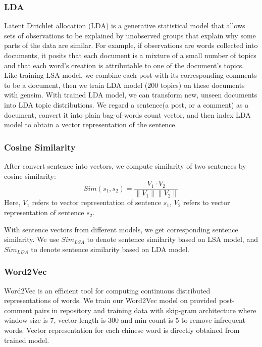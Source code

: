 \documentclass{sig-alternate}
\begin{document}

\subsubsection{LDA}
Latent Dirichlet allocation (LDA) is a generative statistical model that allows sets of observations to be explained by unobserved groups that explain why some parts of the data are similar. For example, if observations are words collected into documents, it posits that each document is a mixture of a small number of topics and that each word's creation is attributable to one of the document's topics.\cite{David} Like training LSA model, we combine each post with its corresponding comments to be a document, then we train LDA model (200 topics) on these documents with gensim. With trained LDA model, we can transform new, unseen documents into LDA topic distributions. We regard a sentence(a post, or a comment) as a document, convert it into plain bag-of-words count vector, and then index LDA model to obtain a vector representation of the sentence. 

\subsubsection{Cosine Similarity} 
After convert sentence into vectors, we compute similarity of two sentences by cosine similarity:
\begin{equation}
   Sim(s_1, s_2) = \frac{V_1 \cdot V_2}{\left \| V_1 \right \| \left \| V_2 \right \|}
\end{equation}
Here, $V_1$ refers to vector representation of sentence $s_1$, $V_2$ refers to vector representation of sentence $s_2$.

With sentence vectors from different models, we get corresponding sentence similarity. We use $Sim_{LSA}$ to denote sentence similarity based on LSA model, and $Sim_{LDA}$ to denote sentence similarity based on LDA model.

\subsubsection{Word2Vec}
Word2Vec is an efficient tool for computing continuous distributed 
representations of words\cite{Mikolov}. We train our Word2Vec model on provided 
post-comment pairs in repository and training 
data with skip-gram architecture where window size is 7, vector 
length is 300 and min count is 5 to remove infrequent words. Vector 
representation for each chinese word is directly obtained from trained model. 
\end{document}
